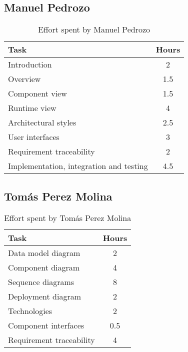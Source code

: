 \subsection{Manuel Pedrozo}

\begin{table}[H]
    \centering
    \begin{tabular}{|p{7cm}|c|}
    \hline
    \textbf{Task} & \textbf{Hours} \\ \hline
    Introduction & 2 \\ \hline
    Overview & 1.5 \\ \hline
    Component view & 1.5 \\ \hline
    Runtime view & 4 \\ \hline
    Architectural styles & 2.5 \\ \hline
    User interfaces & 3 \\ \hline
    Requirement traceability & 2 \\ \hline
    Implementation, integration and testing & 4.5 \\ \hline
    \end{tabular}
    \caption{\label{tbl:manuel-effort} Effort spent by Manuel Pedrozo}
    \end{table}

\subsection{Tomás Perez Molina}
\begin{table}[H]
    \centering
    \begin{tabular}{|p{7cm}|c|}
    \hline
    \textbf{Task} & \textbf{Hours} \\ \hline
    Data model diagram & 2 \\ \hline
    Component diagram & 4 \\ \hline
    Sequence diagrams & 8 \\ \hline
    Deployment diagram & 2 \\ \hline
    Technologies & 2 \\ \hline
    Component interfaces & 0.5 \\ \hline
    Requirement traceability & 4 \\ \hline
    \end{tabular}
    \caption{\label{tbl:tomas-effort} Effort spent by Tomás Perez Molina}
    \end{table}
